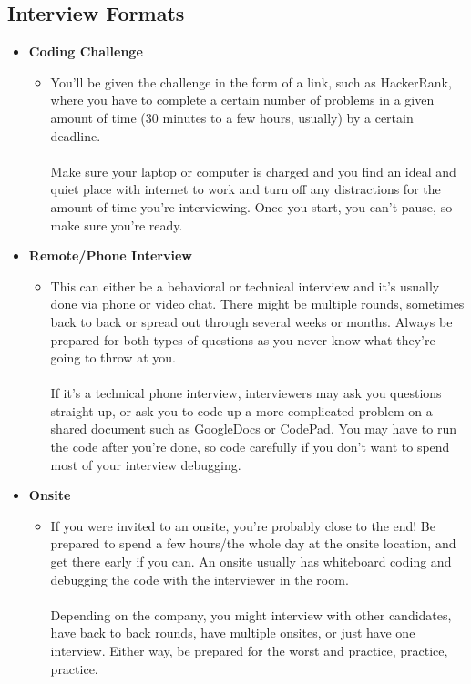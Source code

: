 \documentclass{article}
\begin{document}
\subsection {Interview Formats}
\begin{itemize}
    \item \textbf{Coding Challenge}
    \begin{itemize}
        \item You'll be given the challenge in the form of a link, such as HackerRank, where you have to complete a certain number of problems in a given amount of time (30 minutes to a few hours, usually) by a certain deadline. \\\\ Make sure your laptop or computer is charged and you find an ideal and quiet place with internet to work and turn off any distractions for the amount of time you're interviewing. Once you start, you can't pause, so make sure you're ready.
    \end{itemize}
    \item \textbf{Remote/Phone Interview}
    \begin{itemize}
        \item This can either be a behavioral or technical interview and it's usually done via phone or video chat. There might be multiple rounds, sometimes back to back or spread out through several weeks or months. Always be prepared for both types of questions as you never know what they're going to throw at you. \\\\
        If it's a technical phone interview, interviewers may ask you questions straight up, or ask you to code up a more complicated problem on a shared document such as GoogleDocs or CodePad. You may have to run the code after you're done, so code carefully if you don't want to spend most of your interview debugging.
    \end{itemize}
    \item \textbf{Onsite} 
    \begin{itemize}
        \item If you were invited to an onsite, you're probably close to the end! Be prepared to spend a few hours/the whole day at the onsite location, and get there early if you can. An onsite usually has whiteboard coding and debugging the code with the interviewer in the room.\\\\
        Depending on the company, you might interview with other candidates, have back to back rounds, have multiple onsites, or just have one interview. Either way, be prepared for the worst and practice, practice, practice. \\
    \end{itemize}
\end{itemize}
\end{document}
